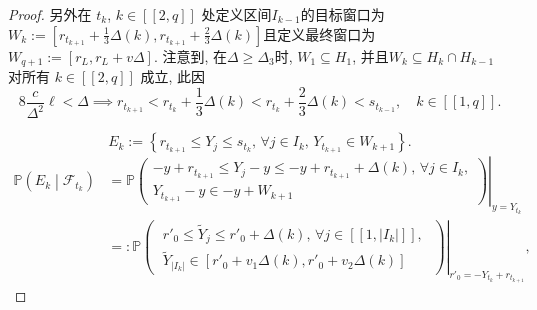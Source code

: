 \begin{proof}
{    }{
        另外在 $t_k$, $k\in[\![2, q]\!]$ 处定义区间$I_{k-1}$的目标窗口为 $W_k:=[r_{t_{k+1}} + \frac{1}{3}\Delta(k), r_{t_{k+1}} + \frac{2}{3}\Delta(k)]$且定义最终窗口为 $W_{q+1} := [r_L, r_L + v\Delta]$. 注意到, 在$\Delta\ge\Delta_3$时, $W_1\subseteq H_1$, 并且$W_k\subseteq H_k\cap H_{k-1}$ 对所有 $k\in[\![2, q]\!]$ 成立, 此因
    }
    \begin{equation*}
        8\frac{c}{\Delta^2}\ell < \Delta
        \implies
        r_{t_{k+1}}
        <
        r_{t_k} + \frac 13\Delta(k)
        <
        r_{t_k} + \frac 23\Delta(k)
        <
        s_{t_{k-1}},
        \quad
        k\in[\![1, q]\!].
    \end{equation*}

    \begin{equation*}
        E_k := \left\{ r_{t_{k+1}} \le Y_j \le s_{t_k}, \, \forall j \in I_k,\, Y_{t_{k+1}} \in W_{k+1} \right\}.
    \end{equation*}
    \begin{align*}
        \mathbb P\left(E_k \middle| \mathcal F_{t_k}\right)
        &=
        \left.\mathbb P\left( \begin{aligned}  - y + r_{t_{k+1}} \le Y_j - y \le  - y + r_{t_{k+1}} + \Delta(k), \, \forall j \in I_k, \\ Y_{t_{k+1}} - y\in -y+W_{k+1} \end{aligned} \right)\right|_{y=Y_{t_k}}
        \\ &=:
        \left.\mathbb P\left(\; \begin{aligned} r'_0 \le \tilde Y_j \le r'_0 + \Delta(k), \, \forall j \in [\![1, |I_k|]\!], \\ \tilde Y_{|I_k|}\in [r'_0 + v_1\Delta(k), r'_0 + v_2\Delta(k)] \end{aligned} \;\right)\right|_{r'_0=-Y_{t_k}+r_{t_{k+1}}},
    \end{align*}
\end{proof}
